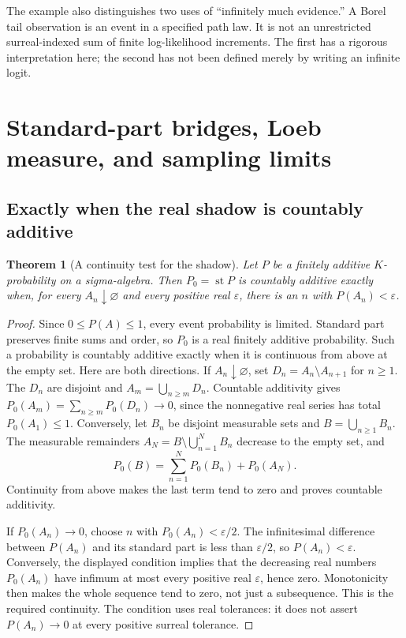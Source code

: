 \documentclass[11pt,a4paper]{article}
\numberwithin{equation}{section}
\newtheorem{theorem}{Theorem}[section]
\theoremstyle{definition}
\theoremstyle{remark}
\newcommand{\st}{\operatorname{st}}
\newcommand{\eps}{\varepsilon}
\begin{document}
The example also distinguishes two uses of ``infinitely much evidence.''
A Borel tail observation is an event in a specified path law. It is not
an unrestricted surreal-indexed sum of finite log-likelihood increments.
The first has a rigorous interpretation here; the second has not been
defined merely by writing an infinite logit.

\section{Standard-part bridges, Loeb measure, and sampling limits}
\label{fsp:sec:bridges}

\subsection{Exactly when the real shadow is countably additive}

\begin{theorem}[A continuity test for the shadow]\label{fsp:thm:shadowcountable}
Let $P$ be a finitely additive $K$-probability on a sigma-algebra.
Then $P_0=\st P$ is countably additive exactly when, for every
$A_n\downarrow\varnothing$ and every positive real $\eps$, there is
an $n$ with $P(A_n)<\eps$.
\end{theorem}
\begin{proof}
Since $0\le P(A)\le1$, every event probability is limited. Standard
part preserves finite sums and order, so $P_0$ is a real finitely additive
probability. Such a probability is countably additive exactly when it
is continuous from above at the empty set. Here are both directions.
If $A_n\downarrow\varnothing$, set $D_n=A_n\setminus A_{n+1}$ for
$n\ge1$. The $D_n$ are disjoint and $A_m=\bigcup_{n\ge m}D_n$.
Countable additivity gives $P_0(A_m)=\sum_{n\ge m}P_0(D_n)\to0$, since
the nonnegative real series has total $P_0(A_1)\le1$.
Conversely, let $B_n$ be disjoint measurable sets and
$B=\bigcup_{n\ge1}B_n$. The measurable remainders
$A_N=B\setminus\bigcup_{n=1}^N B_n$ decrease to the empty set, and
\[
 P_0(B)=\sum_{n=1}^N P_0(B_n)+P_0(A_N).
\]
Continuity from above makes the last term tend to zero and proves
countable additivity.

If $P_0(A_n)\to0$, choose $n$ with $P_0(A_n)<\eps/2$.
The infinitesimal difference between $P(A_n)$ and its standard part is
less than $\eps/2$, so $P(A_n)<\eps$.
Conversely, the displayed condition implies that the decreasing real
numbers $P_0(A_n)$ have infimum at most every positive real $\eps$,
hence zero. Monotonicity then makes the whole sequence tend to zero,
not just a subsequence. This is the required continuity. The condition
uses real tolerances: it does not assert $P(A_n)\to0$ at every positive
surreal tolerance.
\end{proof}
\end{document}
